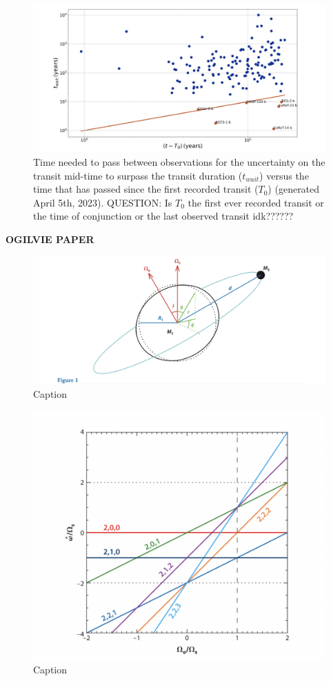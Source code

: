\documentclass[oneside,12pt]{amsart}
\numberwithin{page}{section}
\begin{document}
\begin{figure}[htbp]
    \centering 
    \includegraphics[width=\linewidth]{figs/jackson_fig3.png}
    \caption{Time needed to pass between observations for the uncertainty on the transit mid-time to surpass the transit duration ($t_{wait}$) versus the time that has passed since the first recorded transit ($T_0$) (generated April 5th, 2023). QUESTION: Is $T_0$ the first ever recorded transit or the time of conjunction or the last observed transit idk??????}
    \label{fig:jackson_fig3}
\end{figure}

\clearpage


\textbf{OGILVIE PAPER}

\begin{figure}[htbp]
    \centering
    \includegraphics[width=0.5\linewidth]{figs/ogilvie_fig1.png}
    \caption{Caption}
    \label{fig:enter-label}
\end{figure}

\begin{figure}[htbp]
    \centering
    \includegraphics[width=0.5\linewidth]{figs/ogilvie_fig2.png}
    \caption{Caption}
    \label{fig:enter-label}
\end{figure}
\end{document}
